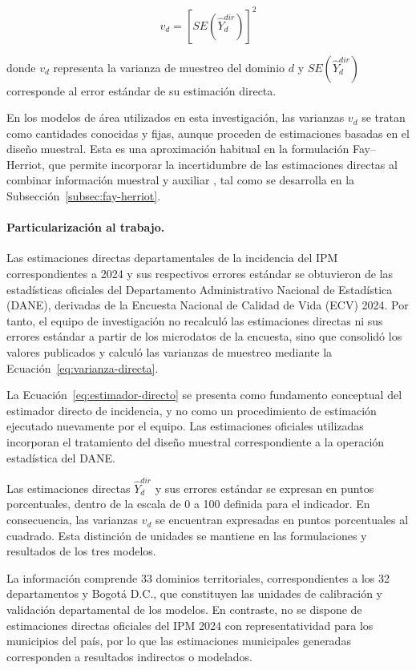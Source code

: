 \begin{equation}
    v_d = \left[SE\!\left(\hat{Y}_d^{dir}\right)\right]^2
    \label{eq:varianza-directa}
\end{equation}

\noindent donde $v_d$ representa la varianza de muestreo del dominio $d$ y $SE(\hat{Y}_d^{dir})$ corresponde al error estándar de su estimación directa.

En los modelos de área utilizados en esta investigación, las varianzas $v_d$ se tratan como cantidades conocidas y fijas, aunque proceden de estimaciones basadas en el diseño muestral. Esta es una aproximación habitual en la formulación Fay--Herriot, que permite incorporar la incertidumbre de las estimaciones directas al combinar información muestral y auxiliar \cite{RaoMolina_2015}, tal como se desarrolla en la Subsección~\ref{subsec:fay-herriot}.

\paragraph{Particularización al trabajo.}
Las estimaciones directas departamentales de la incidencia del IPM correspondientes a 2024 y sus respectivos errores estándar se obtuvieron de las estadísticas oficiales del Departamento Administrativo Nacional de Estadística (DANE), derivadas de la Encuesta Nacional de Calidad de Vida (ECV) 2024. Por tanto, el equipo de investigación no recalculó las estimaciones directas ni sus errores estándar a partir de los microdatos de la encuesta, sino que consolidó los valores publicados y calculó las varianzas de muestreo mediante la Ecuación~\ref{eq:varianza-directa}.

La Ecuación~\ref{eq:estimador-directo} se presenta como fundamento conceptual del estimador directo de incidencia, y no como un procedimiento de estimación ejecutado nuevamente por el equipo. Las estimaciones oficiales utilizadas incorporan el tratamiento del diseño muestral correspondiente a la operación estadística del DANE.

Las estimaciones directas $\hat{Y}_d^{dir}$ y sus errores estándar se expresan en puntos porcentuales, dentro de la escala de 0 a 100 definida para el indicador. En consecuencia, las varianzas $v_d$ se encuentran expresadas en puntos porcentuales al cuadrado. Esta distinción de unidades se mantiene en las formulaciones y resultados de los tres modelos.

La información comprende 33 dominios territoriales, correspondientes a los 32 departamentos y Bogotá D.C., que constituyen las unidades de calibración y validación departamental de los modelos. En contraste, no se dispone de estimaciones directas oficiales del IPM 2024 con representatividad para los municipios del país, por lo que las estimaciones municipales generadas corresponden a resultados indirectos o modelados.

